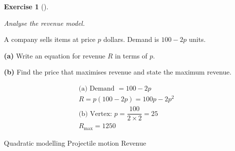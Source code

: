 \documentclass[
  letterpaper,
  DIV=11,
  numbers=noendperiod]{scrreprt}
\theoremstyle{definition}
\newtheorem{exercise}{Exercise}[chapter]
\theoremstyle{remark}
\begin{document}
\begin{exercise}[]\protect\hypertarget{exr-u7-31}{}\label{exr-u7-31}

\emph{Analyse the revenue model.}

A company sells items at price \(p\) dollars. Demand is \(100 - 2p\)
units.

\textbf{(a)} Write an equation for revenue \(R\) in terms of \(p\).

\textbf{(b)} Find the price that maximises revenue and state the maximum
revenue.

\begin{tcolorbox}[enhanced jigsaw, opacitybacktitle=0.6, coltitle=black, arc=.35mm, colframe=quarto-callout-tip-color-frame, colback=white, bottomrule=.15mm, left=2mm, colbacktitle=quarto-callout-tip-color!10!white, titlerule=0mm, opacityback=0, title=\textcolor{quarto-callout-tip-color}{\faLightbulb}\hspace{0.5em}{🔍 View Solution}, leftrule=.75mm, breakable, rightrule=.15mm, bottomtitle=1mm, toptitle=1mm, toprule=.15mm]

\[
\begin{aligned}
\text{(a) Demand } = 100 - 2p \\[4pt] R = p(100 - 2p) = 100p - 2p^2 \\[4pt] \text{(b) Vertex: } p = \dfrac{100}{2 \times 2} = 25 \\[4pt] R_{\text{max}} = 1250
\end{aligned}
\]

\end{tcolorbox}

{Quadratic modelling} {Projectile motion} {Revenue}

\end{exercise}
\end{document}
